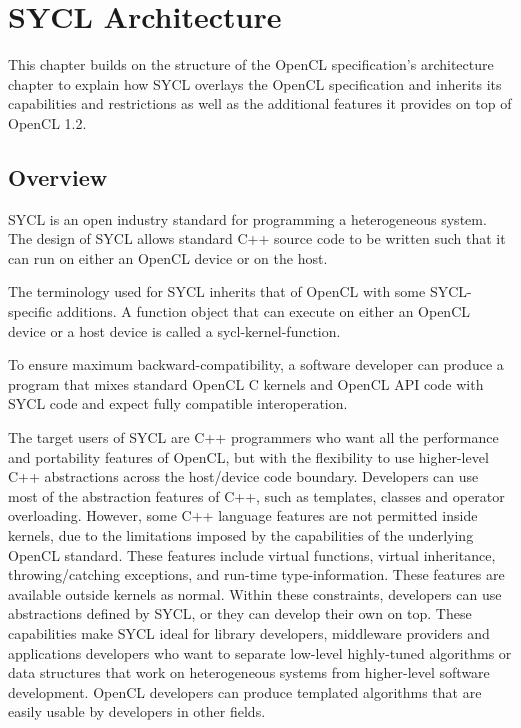 
\chapter{SYCL Architecture}

This chapter builds on the structure of the OpenCL specification's architecture
chapter to explain how SYCL overlays the OpenCL specification and inherits its
capabilities and restrictions as well as the additional features it provides on
top of OpenCL 1.2.

\section{Overview}

SYCL is an open industry standard for programming a heterogeneous system. The
design of SYCL allows standard C++ source code to be written such that it can
run on either an OpenCL device or on the \gls{host}.

The terminology used for SYCL inherits that of OpenCL with some
SYCL-specific additions. A function object that can execute on either
an OpenCL \gls{device} or a \gls{host} \gls{device} is called a
\gls{sycl-kernel-function}.

To ensure maximum backward-compatibility, a software developer can produce
a program that mixes standard OpenCL C kernels and OpenCL API code with
SYCL code and expect fully compatible interoperation.

The target users of SYCL are C++ programmers who want all the performance and
portability features of OpenCL, but with the flexibility to use higher-level C++
abstractions across the host/device code boundary. Developers can use most of
the abstraction features of C++, such as templates, classes and operator
overloading. However, some C++ language features are not permitted inside
kernels, due to the limitations imposed by the capabilities of the underlying
OpenCL standard. These features include virtual functions, virtual inheritance,
throwing/catching exceptions, and run-time type-information. These features are
available outside kernels as normal. Within these constraints, developers can
use abstractions defined by SYCL, or they can develop their own on top. These
capabilities make SYCL ideal for library developers, middleware providers and
applications developers who want to separate low-level highly-tuned algorithms
or data structures that work on heterogeneous systems from higher-level software
development. OpenCL developers can produce templated algorithms that are easily
usable by developers in other fields.

